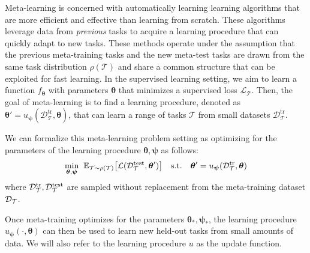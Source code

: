 Meta-learning is concerned with automatically learning learning algorithms that are more efficient and effective than learning from scratch. These algorithms leverage data from \emph{previous} tasks to acquire a learning procedure that can quickly adapt to new tasks. These methods operate under the assumption that the previous meta-training tasks and the new meta-test tasks are drawn from the same task distribution $\rho(\mathcal{T})$ and share a common structure that can be exploited for fast learning. In the supervised learning setting, we aim to learn a function $f_{\bm{\theta}}$
with parameters ${\bm \theta}$ that minimizes 
a supervised loss $\mathcal{L}_{\mathcal{T}}$. 
Then, the goal of meta-learning is to find a learning procedure, denoted as $\bm{\theta}'= u_{\bm{\psi}}(\mathcal{D}_\mathcal{T}^\text{tr}, \bm{\theta})$, 
that can learn a range of tasks $\mathcal{T}$ from small datasets $\mathcal{D}_\mathcal{T}^\text{tr}$.

We can formalize this meta-learning problem setting as optimizing
for the parameters of the learning procedure ${\bm \theta}, {\bm \psi}$ as follows:
\begin{align}
    \min_{\bm{\theta}, \bm{\psi}} \hspace{4pt} \mathbb{E}_{\mathcal{T} \sim \rho({\mathcal{T}})} %
    \big[ \mathcal{L}(\data_\task^\text{test}, {\bm \theta}') \big] \hspace{10pt}
\text{s.t.} \hspace{10pt} \bm{\theta}'= u_{\bm{\psi}}(\mathcal{D}_\mathcal{T}^\text{tr}, \bm{\theta})
\end{align}
where $\mathcal{D}_{\mathcal{T}}^\text{tr}, \mathcal{D}_{\mathcal{T}}^\text{test}$ are sampled without replacement from the meta-training dataset $\mathcal{D}_{\mathcal{T}}$.

Once meta-training optimizes for the parameters ${\bm \theta}_*, {\bm \psi}_*$, the learning procedure $u_{\bm \psi}(\cdot, {\bm \theta})$ can then be used to learn new held-out tasks from small amounts of data.
We will also refer to the learning procedure $u$ as the update function.

